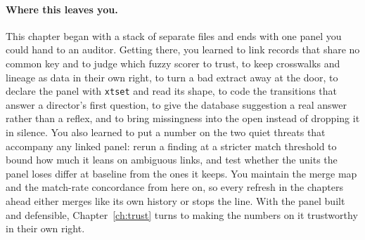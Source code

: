 \documentclass[
    a4paper,
    fontsize=10pt,
    twoside=true,
    numbers=noenddot,
]{kaobook}
\begin{document}
\paragraph{Where this leaves you.} This chapter began with a stack of separate files and ends with one panel you could hand to an auditor. Getting there, you learned to link records that share no common key and to judge which fuzzy scorer to trust, to keep crosswalks and lineage as data in their own right, to turn a bad extract away at the door, to declare the panel with \texttt{xtset} and read its shape, to code the transitions that answer a director's first question, to give the database suggestion a real answer rather than a reflex, and to bring missingness into the open instead of dropping it in silence. You also learned to put a number on the two quiet threats that accompany any linked panel: rerun a finding at a stricter match threshold to bound how much it leans on ambiguous links, and test whether the units the panel loses differ at baseline from the ones it keeps. You maintain the merge map and the match-rate concordance from here on, so every refresh in the chapters ahead either merges like its own history or stops the line. With the panel built and defensible, Chapter~\ref{ch:trust} turns to making the numbers on it trustworthy in their own right.
\end{document}
